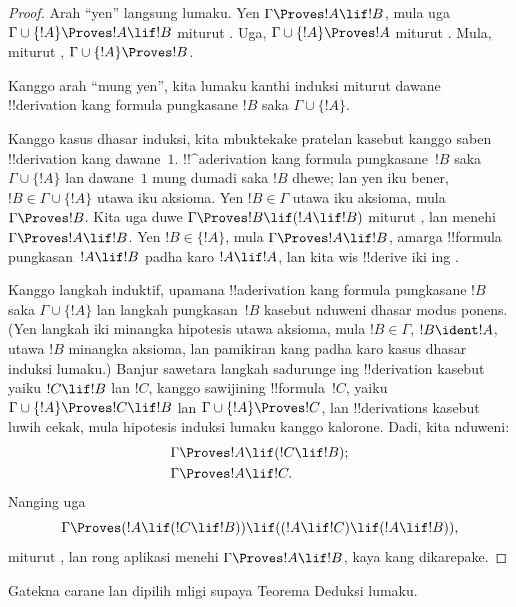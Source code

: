 \documentclass[../../../include/open-logic-section]{subfiles}
\begin{document}
\begin{proof}
Arah “yen” langsung lumaku. Yen $\Gamma \Proves !A \lif !B$, mula
uga $\Gamma \cup \{!A\} \Proves !A \lif !B$ miturut
. Uga, $\Gamma \cup \{!A\} \Proves !A$
miturut . Mula, miturut
, $\Gamma \cup \{!A\} \Proves !B$.

Kanggo arah “mung yen”, kita lumaku kanthi induksi miturut dawane
!!{derivation} kang formula pungkasane $!B$ saka $\Gamma \cup \{!A\}$.

Kanggo kasus dhasar induksi, kita mbuktekake pratelan kasebut kanggo
saben !!{derivation} kang dawane~$1$. !!^a{derivation} kang formula
pungkasane~$!B$ saka $\Gamma \cup \{!A\}$ lan dawane~$1$ mung dumadi
saka $!B$ dhewe; lan yen iku bener, $!B \in \Gamma \cup \{!A\}$ utawa
iku aksioma.
Yen $!B \in \Gamma$ utawa iku
aksioma, mula $\Gamma \Proves !B$. Kita uga duwe $\Gamma
\Proves !B \lif (!A \lif !B)$ miturut , lan
 menehi $\Gamma \Proves !A \lif !B$. Yen $!B \in \{
!A\}$, mula $\Gamma \Proves !A \lif !B$, amarga !!{formula}
pungkasan~$!A \lif !B$ padha karo $!A \lif !A$, lan kita wis
!!{derive} iki ing .

Kanggo langkah induktif, upamana !!a{derivation} kang formula pungkasane
$!B$ saka $\Gamma \cup \{!A\}$ lan langkah pungkasan~$!B$ kasebut
nduweni dhasar modus ponens. (Yen langkah iki minangka hipotesis utawa aksioma, mula
$!B \in \Gamma$, $!B \ident !A$, utawa $!B$ minangka aksioma, lan
pamikiran kang padha karo kasus dhasar induksi lumaku.) Banjur sawetara
langkah sadurunge ing !!{derivation} kasebut yaiku $!C \lif !B$ lan
$!C$, kanggo sawijining !!{formula}~$!C$, yaiku $\Gamma \cup \{!A\}
\Proves !C \lif !B$ lan $\Gamma \cup \{!A\} \Proves !C$, lan
!!{derivation}s kasebut luwih cekak, mula hipotesis induksi lumaku
kanggo kalorone. Dadi, kita nduweni:
\begin{align*}
  & \Gamma \Proves !A \lif (!C \lif !B); \\
  & \Gamma \Proves !A \lif !C.
\end{align*}
Nanging uga
\[
\Gamma \Proves (!A \lif (!C \lif !B)) \lif
((!A\lif !C)  \lif (!A \lif !B)),
\]
miturut , lan rong aplikasi
 menehi $\Gamma \Proves !A \lif !B$, kaya kang
dikarepake.
\end{proof}

Gatekna carane  lan  dipilih
mligi supaya Teorema Deduksi lumaku.
\end{document}
